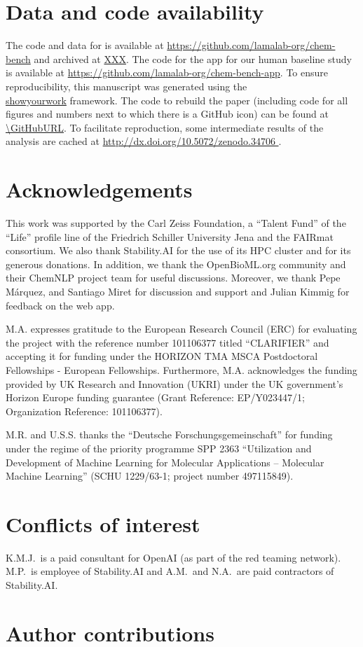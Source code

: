 \documentclass[11pt, oneside]{article}
\begin{document}
\begin{refsection}
\section*{Data and code availability}
The code and data for \chembench is available at \url{https://github.com/lamalab-org/chem-bench} and archived at \url{XXX}.
The code for the app for our human baseline study is available at \url{https://github.com/lamalab-org/chem-bench-app}. 
To ensure reproducibility, this manuscript was generated using the \href{https://show-your.work/en/latest/}{\\showyourwork} framework.\autocite{Luger2021}
The code to rebuild the paper (including code for all figures and numbers next to which there is a GitHub icon) can be found at \url{\GitHubURL}. 
To facilitate reproduction, some intermediate results of the analysis are cached at \url{http://dx.doi.org/10.5072/zenodo.34706 }.

\section*{Acknowledgements}
This work was supported by the Carl Zeiss Foundation, a \enquote{Talent Fund} of the \enquote{Life} profile line of the Friedrich Schiller University Jena and the FAIRmat consortium.
We also thank Stability.AI for the use of its HPC cluster and for its generous donations.
In addition, we thank the OpenBioML.org community and their ChemNLP project team for useful discussions. Moreover, we thank Pepe Márquez, and Santiago Miret for discussion and support and Julian Kimmig for feedback on the web app. 

M.A. expresses gratitude to the European Research Council (ERC) for evaluating the project with the reference number 101106377 titled \enquote{CLARIFIER} and accepting it for funding under the HORIZON TMA MSCA Postdoctoral Fellowships - European Fellowships. 
Furthermore, M.A. acknowledges the funding provided by UK Research and Innovation (UKRI) under the UK government’s Horizon Europe funding guarantee (Grant Reference: EP/Y023447/1; Organization Reference: 101106377).

M.R. and U.S.S. thanks the \enquote{Deutsche Forschungsgemeinschaft} for funding under the regime of the priority programme SPP 2363 \enquote{Utilization and Development of Machine Learning for Molecular Applications – Molecular Machine Learning} (SCHU 1229/63-1; project number 497115849).


\section*{Conflicts of interest}
K.M.J.\ is a paid consultant for OpenAI (as part of the red teaming network). M.P.\ is employee of Stability.AI and A.M.\ and N.A.\ are paid contractors of Stability.AI.

\section*{Author contributions}

\scriptsize
\insertcredits
\normalsize
\printbibliography
\end{refsection}
\end{document}
